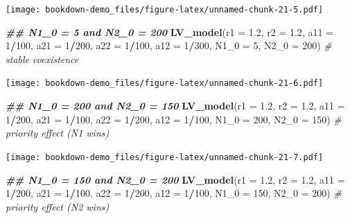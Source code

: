 \documentclass[
]{book}
\newenvironment{Shaded}{\begin{snugshade}}{\end{snugshade}}
\newcommand{\AttributeTok}[1]{\textcolor[rgb]{0.13,0.29,0.53}{#1}}
\newcommand{\CommentTok}[1]{\textcolor[rgb]{0.56,0.35,0.01}{\textit{#1}}}
\newcommand{\DecValTok}[1]{\textcolor[rgb]{0.00,0.00,0.81}{#1}}
\newcommand{\DocumentationTok}[1]{\textcolor[rgb]{0.56,0.35,0.01}{\textbf{\textit{#1}}}}
\newcommand{\FloatTok}[1]{\textcolor[rgb]{0.00,0.00,0.81}{#1}}
\newcommand{\FunctionTok}[1]{\textcolor[rgb]{0.13,0.29,0.53}{\textbf{#1}}}
\newcommand{\NormalTok}[1]{#1}
\newcommand{\SpecialCharTok}[1]{\textcolor[rgb]{0.81,0.36,0.00}{\textbf{#1}}}
\begin{document}
\texttt{[image: bookdown-demo\_files/figure-latex/unnamed-chunk-21-5.pdf]}

\begin{Shaded}
\begin{Highlighting}[]
  \DocumentationTok{\#\# N1\_0 = 5 and N2\_0 = 200}
  \FunctionTok{LV\_model}\NormalTok{(}\AttributeTok{r1 =} \FloatTok{1.2}\NormalTok{, }\AttributeTok{r2 =} \FloatTok{1.2}\NormalTok{, }\AttributeTok{a11 =} \DecValTok{1}\SpecialCharTok{/}\DecValTok{100}\NormalTok{, }\AttributeTok{a21 =} \DecValTok{1}\SpecialCharTok{/}\DecValTok{200}\NormalTok{, }\AttributeTok{a22 =} \DecValTok{1}\SpecialCharTok{/}\DecValTok{100}\NormalTok{, }\AttributeTok{a12 =} \DecValTok{1}\SpecialCharTok{/}\DecValTok{300}\NormalTok{, }\AttributeTok{N1\_0 =} \DecValTok{5}\NormalTok{, }\AttributeTok{N2\_0 =} \DecValTok{200}\NormalTok{)  }\CommentTok{\# stable coexistence}
\end{Highlighting}
\end{Shaded}

\texttt{[image: bookdown-demo\_files/figure-latex/unnamed-chunk-21-6.pdf]}

\begin{Shaded}
\begin{Highlighting}[]
  \DocumentationTok{\#\# N1\_0 = 200 and N2\_0 = 150}
  \FunctionTok{LV\_model}\NormalTok{(}\AttributeTok{r1 =} \FloatTok{1.2}\NormalTok{, }\AttributeTok{r2 =} \FloatTok{1.2}\NormalTok{, }\AttributeTok{a11 =} \DecValTok{1}\SpecialCharTok{/}\DecValTok{200}\NormalTok{, }\AttributeTok{a21 =} \DecValTok{1}\SpecialCharTok{/}\DecValTok{100}\NormalTok{, }\AttributeTok{a22 =} \DecValTok{1}\SpecialCharTok{/}\DecValTok{200}\NormalTok{, }\AttributeTok{a12 =} \DecValTok{1}\SpecialCharTok{/}\DecValTok{100}\NormalTok{, }\AttributeTok{N1\_0 =} \DecValTok{200}\NormalTok{, }\AttributeTok{N2\_0 =} \DecValTok{150}\NormalTok{)  }\CommentTok{\# priority effect (N1 wins)}
\end{Highlighting}
\end{Shaded}

\texttt{[image: bookdown-demo\_files/figure-latex/unnamed-chunk-21-7.pdf]}

\begin{Shaded}
\begin{Highlighting}[]
  \DocumentationTok{\#\# N1\_0 = 150 and N2\_0 = 200}
  \FunctionTok{LV\_model}\NormalTok{(}\AttributeTok{r1 =} \FloatTok{1.2}\NormalTok{, }\AttributeTok{r2 =} \FloatTok{1.2}\NormalTok{, }\AttributeTok{a11 =} \DecValTok{1}\SpecialCharTok{/}\DecValTok{200}\NormalTok{, }\AttributeTok{a21 =} \DecValTok{1}\SpecialCharTok{/}\DecValTok{100}\NormalTok{, }\AttributeTok{a22 =} \DecValTok{1}\SpecialCharTok{/}\DecValTok{200}\NormalTok{, }\AttributeTok{a12 =} \DecValTok{1}\SpecialCharTok{/}\DecValTok{100}\NormalTok{, }\AttributeTok{N1\_0 =} \DecValTok{150}\NormalTok{, }\AttributeTok{N2\_0 =} \DecValTok{200}\NormalTok{)  }\CommentTok{\# priority effect (N2 wins)}
\end{Highlighting}
\end{Shaded}
\end{document}
